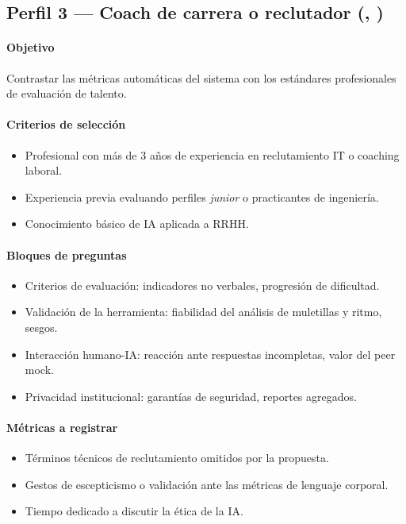 \subsection{Perfil 3 --- Coach de carrera o reclutador (, )}

\paragraph{Objetivo} Contrastar las métricas automáticas del sistema
con los estándares profesionales de evaluación de talento.

\paragraph{Criterios de selección}
\begin{itemize}
  \item Profesional con más de 3 años de experiencia en reclutamiento
        IT o coaching laboral.
  \item Experiencia previa evaluando perfiles \textit{junior} o
        practicantes de ingeniería.
  \item Conocimiento básico de IA aplicada a RRHH.
\end{itemize}

\paragraph{Bloques de preguntas}
\begin{itemize}
  \item Criterios de evaluación: indicadores no verbales,
        progresión de dificultad.
  \item Validación de la herramienta: fiabilidad del análisis de
        muletillas y ritmo, sesgos.
  \item Interacción humano-IA: reacción ante respuestas incompletas,
        valor del peer mock.
  \item Privacidad institucional: garantías de seguridad, reportes
        agregados.
\end{itemize}

\paragraph{Métricas a registrar}
\begin{itemize}
  \item Términos técnicos de reclutamiento omitidos por la propuesta.
  \item Gestos de escepticismo o validación ante las métricas de
        lenguaje corporal.
  \item Tiempo dedicado a discutir la ética de la IA.
\end{itemize}

